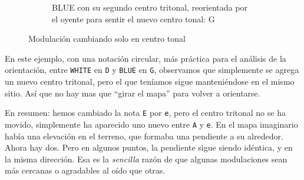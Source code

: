 \documentclass[]{report}
\begin{document}
\begin{figure}[H]
\begin{subfigure}{0.30\textwidth}
  \end{subfigure}
  \hfill
  \begin{subfigure}{0.30\textwidth}
    \centering
    \caption{\textsf{BLUE} con su segundo centro tritonal, reorientada por el oyente para sentir el nuevo centro tonal: \textsf{G}}
    
  \end{subfigure}
  \hfill
  \caption{Modulación cambiando solo en centro tonal}\label{fig:modulation-changing-tonal-center}
  \end{figure}

En este ejemplo, con una notación circular, más práctica para el análisis de la orientación, entre \texttt{WHITE} en \texttt{D} y \texttt{BLUE} en \texttt{G}, observamos que simplemente se agrega un nuevo centro tritonal, pero el que teníamos sigue manteniéndose en el mismo sitio. Así que no hay mas que ``girar el mapa'' para volver a orientarse.

En resumen: hemos cambiado la nota \texttt{E} por \texttt{e}, pero el centro tritonal no se ha movido, simplemente ha aparecido uno nuevo entre \texttt{A} y \texttt{e}. En el mapa imaginario había una elevación en el terreno, que formaba una pendiente a su alrededor. Ahora hay dos. Pero en algunos puntos, la pendiente sigue siendo idéntica, y en la misma dirección. Esa es la \emph{sencilla} razón de que algunas modulaciones sean más cercanas o agradables al oído que otras.
\end{document}
